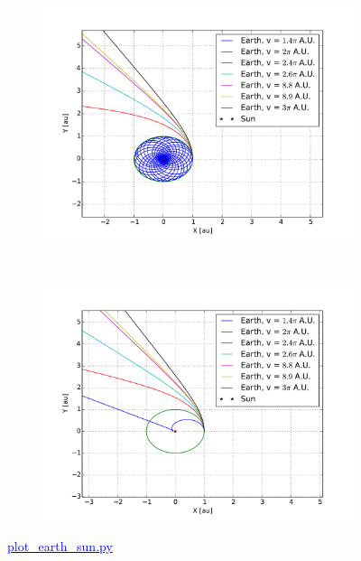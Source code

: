 \begin{figure}[H]
    \centering
    \begin{subfigure}{0.5\textwidth}
        \centering
        \includegraphics[width=\linewidth]{result/bilder/escape-velocity-r275.pdf}
    	\caption{}
    \end{subfigure}%
    ~ 
    \begin{subfigure}{0.5\textwidth}
        \centering
        \includegraphics[width=\linewidth]{result/bilder/escape-velocity-r3.pdf}
        \caption{}
    \end{subfigure}
    \caption{\href{https://github.com/erikfsk/Project-3/blob/master/Project3/3a/plot_earth_sun.py}{\textcolor{blue}{plot\_earth\_sun.py}}}
    \label{fig:escape-velocity-high}
\end{figure}

